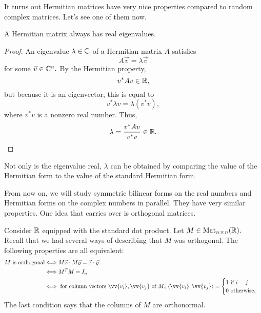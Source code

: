 It turns out Hermitian matrices have very nice properties compared to random complex matrices. Let's see one of them now.
\begin{claim}
A Hermitian matrix always has real eigenvalues. 
\end{claim}
\begin{proof}
An eigenvalue $\lambda \in \mathbb C$ of a Hermitian matrix $A$ satisfies 
\[
A\vec{v} = \lambda \vec{v}
\]
for some $\vec{v} \in \mathbb C^n.$ By the Hermitian property, 
\[
v^*Av \in \mathbb R,
\]
but because it is an eigenvector, this is equal to 
\[
v^*\lambda v = \lambda(v^*v),
\]
where $v^*v$ is a nonzero real number. Thus, 
\[
\lambda = \frac{v^*Av}{v^*v} \in \mathbb R.
\]
\end{proof}

%
Not only is the eigenvalue real, $\lambda$ can be obtained by comparing the value of the Hermitian form to the value of the standard Hermitian form. 

From now on, we will study symmetric bilinear forms on the real numbers and Hermitian forms on the complex numbers in parallel. They have very similar properties. 
One idea that carries over is orthogonal matrices.
\begin{example}
Consider $\mathbb R$ equipped with the standard dot product. Let $M \in \text{Mat}_{n \hspace{0.05em}{\times}\hspace{0.05em} n}(\mathbb R).$ Recall that we had several ways of describing that $M$ was orthogonal. The following properties are all equivalent:
\begin{align*}
    M \text{ is orthogonal} &\Longleftrightarrow M\vec{x} \cdot M\vec{y} = \vec{x} \cdot \vec{y} \\
    &\Longleftrightarrow M^TM = I_n \\
    &\Longleftrightarrow \text{ for column vectors $\vv{v_i}, \vv{v_j}$ of $M$, } 
    \langle \vv{v_i}, \vv{v_j} \rangle = \begin{cases} 1 \text { if $i=j$} \\ 0 \text{ otherwise}.\end{cases}
\end{align*}
The last condition says that the columns of $M$ are orthonormal.
\end{example}

